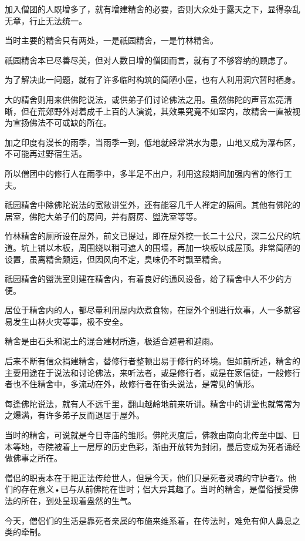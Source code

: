 \documentclass[twoside,openany]{book}
\begin{document}
加入僧团的人既增多了，就有增建精舍的必要，否则大众处于露天之下，显得杂乱无章，行止无法统一。

当时主要的精舍只有两处，一是祇园精舍，一是竹林精舍。

祇园精舍本已尽善尽美，但对人数日增的僧团而言，就有了不够容纳的顾虑了。

为了解决此一问题，就有了许多临时构筑的简陋小屋，也有人利用洞穴暂时栖身。

大的精舍则用来供佛陀说法，或供弟子们讨论佛法之用。虽然佛陀的声音宏亮清晰，但在荒郊野外对着成千上百的人演说，其效果究竟不如室内，故精舍一直被视为宣扬佛法不可或缺的所在。

加之印度有漫长的雨季，当雨季一到，低地就经常洪水为患，山地又成为瀑布区，不可能再过野宿生活。

所以僧团中的修行人在雨季中，多半足不出户，利用这段期间加强内省的修行工夫。

祇园精舍中除佛陀说法的宽敞讲堂外，还有能容几千人禅定的隔间。其他有佛陀的居室，佛陀大弟子们的房间，并有厨房、盥洗室等等。

竹林精舍的厕所设在屋外，前文已提过，即在屋外挖一长二十公尺，深二公尺的坑道。坑上铺以木板，周围绕以稍可遮人的围墙，再加一块板以成屋顶。非常简陋的设置，虽离精舍颇远，但因风向不定，臭味仍不时飘至精舍。

祇园精舍的盥洗室则建在精舍内，有着良好的通风设备，给了精舍中人不少的方便。

居位于精舍内的人，都尽量利用屋内炊煮食物，在屋外个别进行炊事，人一多就容易发生山林火灾等事，极不安全。

精舍是由石头和泥土的混合建材所造，极适合避暑和避雨。

后来不断有信众捐建精舍，替修行者整顿出易于修行的环境。但如前所述，精舍的主要用途在于说法和讨论佛法，来听法者，或是修行者，或是在家信徒，一般修行者也不住精舍中，多流动在外，故修行者在街头说法，是常见的情形。

每逢佛陀说法，就有人不远千里，翻山越岭地前来听讲。精舍中的讲堂也就常常为之爆满，有许多弟子反而退居于屋外。

当时的精舍，可说就是今日寺庙的雏形。佛陀灭度后，佛教由南向北传至中国、日本等地，寺院被着上一层厚的历史色彩，渐由开放转为封闭，最后变成为死者诵经做佛事之所在。

僧侣的职责本在于把正法传给世人，但是今天，他们只是死者灵魂的守护者7。他们的存在意义•已与从前佛陀在世时；侣大异其趣了。当时的精舍，是僧俗授受佛法的所在，到处呈现着盎然的生气。

今天，僧侣们的生活是靠死者亲属的布施来维系着，在传法时，难免有仰人鼻息之类的牵制。
\end{document}
